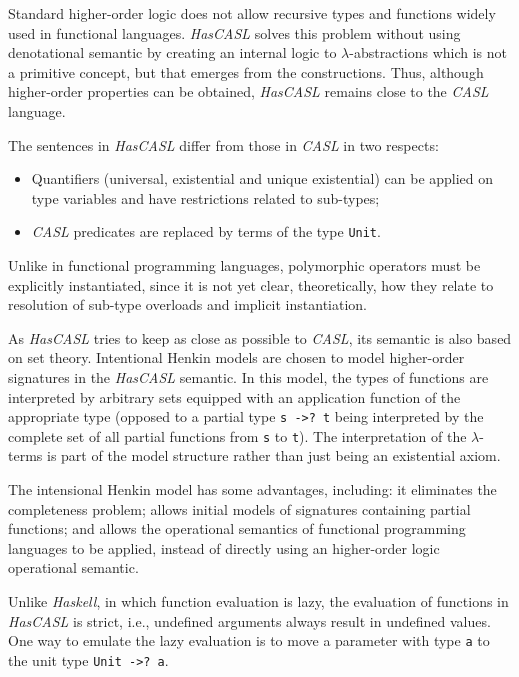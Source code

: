 \documentclass[12pt,twoside]{article}
\numberwithin{spec}{subsection}
\numberwithin{proof}{subsection}
\numberwithin{figure}{subsection}
\numberwithin{code}{subsection}
\begin{document}
Standard higher-order logic does not allow recursive types and functions widely used in functional languages. \textit{HasCASL} solves this problem without using denotational semantic by creating an internal logic to $\lambda$-abstractions which is not a primitive concept, but that emerges from the constructions. Thus, although higher-order properties can be obtained, \textit{HasCASL} remains close to the \textit{CASL} language.

The sentences in \textit{HasCASL} differ from those in \textit{CASL} in two respects: 
\begin{itemize}
\item Quantifiers (universal, existential and unique existential) can be applied on type variables and have restrictions related to sub-types;
\item \textit{CASL} predicates are replaced by terms of the type \verb.Unit..
\end{itemize}

Unlike in functional programming languages, polymorphic operators must be explicitly instantiated, since it is not yet clear, theoretically, how they relate to resolution of sub-type overloads and implicit instantiation.

As \textit{HasCASL} tries to keep as close as possible to \textit{CASL}, its semantic is also based on set theory. Intentional Henkin models are chosen to model higher-order signatures in the \textit{HasCASL} semantic. In this model, the types of functions are interpreted by arbitrary sets equipped with an application function of the appropriate type (opposed to a partial type \verb.s ->? t. being interpreted by the complete set of all partial functions from \verb.s. to \verb.t.). The interpretation of the $\lambda$-terms is part of the model structure rather than just being an existential axiom.

The intensional Henkin model has some advantages, including: it eliminates the completeness problem; allows initial models of signatures containing partial functions; and allows the operational semantics of functional programming languages to be applied, instead of directly using an higher-order logic operational semantic.

Unlike \textit{Haskell}, in which function evaluation is lazy, the evaluation of functions in \textit{HasCASL} is strict, i.e., undefined arguments always result in undefined values. One way to emulate the lazy evaluation is to move a parameter with type \verb.a. to the unit type \verb.Unit ->? a..
\end{document}
